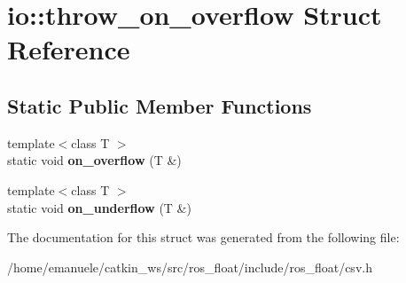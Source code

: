 \hypertarget{structio_1_1throw__on__overflow}{}\section{io\+:\+:throw\+\_\+on\+\_\+overflow Struct Reference}
\label{structio_1_1throw__on__overflow}
\subsection*{Static Public Member Functions}
\begin{DoxyCompactItemize}
\item 
\mbox{\label{structio_1_1throw__on__overflow_a0a59c1dc2ead1a9275c62885ec7545d2}} 
{\footnotesize template$<$class T $>$ }\\static void {\bfseries on\+\_\+overflow} (T \&)
\item 
\mbox{\label{structio_1_1throw__on__overflow_a2ae91b1ae3d655c16f7e6a7e9a1abd92}} 
{\footnotesize template$<$class T $>$ }\\static void {\bfseries on\+\_\+underflow} (T \&)
\end{DoxyCompactItemize}


The documentation for this struct was generated from the following file\+:\begin{DoxyCompactItemize}
\item 
/home/emanuele/catkin\+\_\+ws/src/ros\+\_\+float/include/ros\+\_\+float/csv.\+h\end{DoxyCompactItemize}

